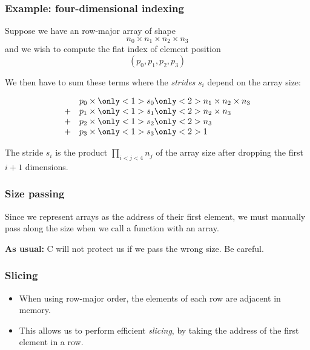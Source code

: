\documentclass[rgb,dvipsnames,aspectratio=169,xcolor=table]{beamer}
\begin{document}
\begin{frame}
  \frametitle{Example: four-dimensional indexing}

  Suppose we have an row-major array of shape
  \[
    n_{0} \times n_{1} \times n_{2} \times n_{3}
  \]
  and we wish to compute the flat index of element position
  \[
    (p_{0}, p_{1}, p_{2}, p_{3})
  \]

  We then have to sum these terms where the \textit{strides} $s_{i}$
  depend on the array size:

  \[
    \begin{array}{rl}
      & p_{0} \times \only<1>{s_{0}}\only<2>{n_{1} \times n_{2} \times n_{3}} \\
      + & p_{1} \times \only<1>{s_{1}}\only<2>{n_{2} \times n_{3}} \\
      + & p_{2} \times \only<1>{s_{2}}\only<2>{n_{3}} \\
      + & p_{3} \times \only<1>{s_{3}}\only<2>{1}
    \end{array}
  \]

  \pause

  The stride $s_{i}$ is the product $\prod_{i<j<4} n_{j}$ of the array
  size after dropping the first $i+1$ dimensions.

\end{frame}

\begin{frame}
  \frametitle{Size passing}

  Since we represent arrays as the address of their first element, we
  must manually pass along the size when we call a function with an
  array.



\textbf{As usual:} C will not protect us if we pass the wrong size.
Be careful.

\end{frame}

\begin{frame}
  \frametitle{Slicing}

  \begin{itemize}
  \item When using row-major order, the elements of each row are
    adjacent in memory.
  \item This allows us to perform efficient \textit{slicing}, by
    taking the address of the first element in a row.
  \end{itemize}



\end{frame}
\end{document}
